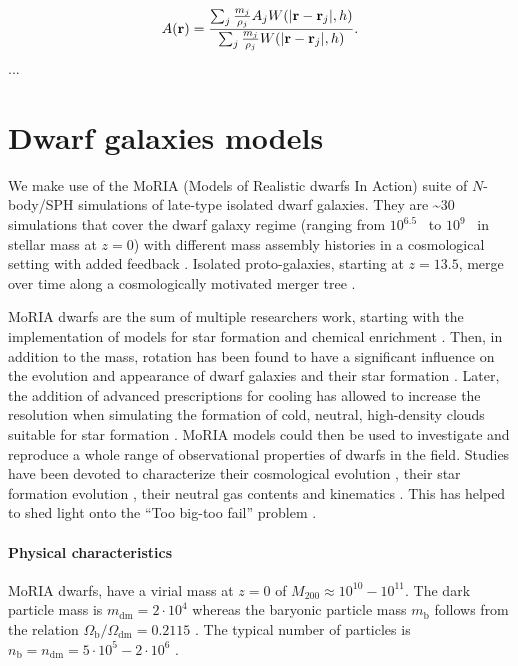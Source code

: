 \begin{equation}
 A(\boldsymbol{\mathbf{r}}) = \dfrac{\sum_j \frac{m_j}{\rho_j} A_j W(|\boldsymbol{\mathbf{r}} - \boldsymbol{\mathbf{r}}_j|,h)}{\sum_j \frac{m_j}{\rho_j} W(|\boldsymbol{\mathbf{r}} - \boldsymbol{\mathbf{r}}_j|,h)}.
\end{equation}
...

\section{Dwarf galaxies models}
\label{sec:dwarf_models}
We make use of the MoRIA (Models of Realistic dwarfs In Action) suite of $N$-body/SPH simulations of late-type isolated dwarf galaxies.
They are \textasciitilde$30$ simulations that cover the dwarf galaxy regime (ranging from $10^{6.5}$~\Msun{} to $10^9$~\Msun{} in stellar mass at $z=0$) with different mass assembly histories in a cosmological setting with added \popiii{} feedback \citep{Verbeke2017}.
Isolated proto-galaxies, starting at $z = 13.5$, merge over time along a cosmologically motivated merger tree \citep{Cloet-Osselaer2014}.

MoRIA dwarfs are the sum of multiple researchers work, starting with the implementation of models for star formation and chemical enrichment \citep{Valcke2008}.
Then, in addition to the mass, rotation has been found to have a significant influence on the evolution and appearance of dwarf galaxies and their star formation \citep{Schroyen2011}.
Later, the addition of advanced prescriptions for cooling has allowed to increase the resolution when simulating the formation of cold, neutral, high-density clouds suitable for star formation \citep{DeRijcke2013}. %
MoRIA models could then be used to investigate and reproduce a whole range of observational properties of dwarfs in the field.
Studies have been devoted to characterize their cosmological evolution \citep{Cloet-Osselaer2012}, their star formation evolution \citep{Verbeke2015}, their neutral gas contents and kinematics \citep{Koleva2014}.
This has helped to shed light onto the ``Too big-too fail'' problem \citep{Verbeke2017}.


\paragraph{Physical characteristics} MoRIA dwarfs, have a virial mass at $z=0$ of $M_{200} \approx 10^{10} - 10^{11}$\Msun{}. The dark particle mass is $m_{\mathrm{dm}} = 2 \cdot 10^4$ \Msun{} whereas the baryonic particle mass $m_{\mathrm{b}}$ follows from the relation $\Omega_\mathrm{b}/\Omega_{\mathrm{dm}} = 0.2115$ \citep{Planck2015}.
The typical number of particles is $n_\mathrm{b} = n_{\mathrm{dm}} = 5 \cdot 10^5 - 2 \cdot 10^6$ \Msun{}.

